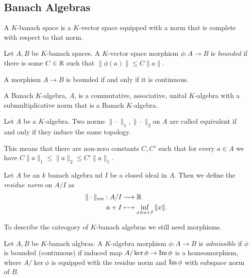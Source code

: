 \subsection{Banach Algebras} \label{sec:banach_algebras}
\begin{definition}
	A $K$-banach space is a $K$-vector space equipped with a norm that is complete with respect to that norm. 
\end{definition}

\begin{definition}
	Let $A, B$ be $K$-banach spaces. 
	A $K$-vector space morphism $\phi: A \to B$ is \emph{bounded} if there is some $C\in \mathbb{R}$ such that $\|\phi(a)\|\le C \|a\| $. 
\end{definition}

\begin{lemma}
	A morphism $A \to B$ is bounded if and only if it is continuous. 
\end{lemma}

\begin{definition}
	A Banach $K$-algebra, $A$, is a commutative, associative, unital $K$-algebra with a submultiplicative norm that is a Banach $K$-algebra.
\end{definition}
\begin{definition}
	Let $A$ be a $K$-algebra. 
	Two norms $\|\cdot \|_1, \|\cdot \|_2$on $A$ are called equivalent if and only if they induce the same topology. 

	This means that there are non-zero constants $C, C'$ such that for every $ a\in A$ we have $C\|a\|_1 \le \|a\|_2 \le C'\|a\|_1$. 
\end{definition}

\begin{definition}
	Let $A$ be an $k$ banach algebra nd $I$ be a closed ideal in $A$. 
	Then we define the \emph{residue norm} on $A / I$ as 
	\begin{align*}
		\|\cdot \|_\text{res} : A / I &\longrightarrow \mathbb{R} \\
		a + I &\longmapsto \inf_{x \in a + I} \|x\|
	.\end{align*}
\end{definition}

To describe the cateogory of $K$-banach algebras we still need morphisms.
\begin{definition}
	Let $A, B$ be $K$-banach algbras. 
	A $K$-algebra morphism $\phi: A \to B$ is \emph{admissible} if $\phi$ is bounded (continuous) if induced map $A / \ker \phi \to \operatorname{Im} \phi$ is a homeomorphism, where $A / \ker \phi$ is equipped with the residue norm and $\operatorname{Im} \phi$ with subspace norm of $B$. 
\end{definition}


